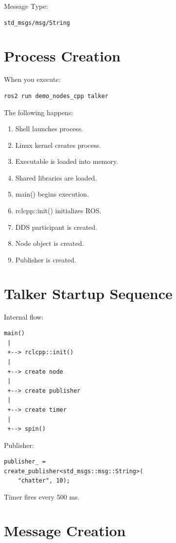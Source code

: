 \documentclass[11pt]{article}
\begin{document}
Message Type:

\begin{verbatim}
std_msgs/msg/String
\end{verbatim}

\section{Process Creation}

When you execute:

\begin{verbatim}
ros2 run demo_nodes_cpp talker
\end{verbatim}

The following happens:

\begin{enumerate}
\item Shell launches process.
\item Linux kernel creates process.
\item Executable is loaded into memory.
\item Shared libraries are loaded.
\item main() begins execution.
\item rclcpp::init() initializes ROS.
\item DDS participant is created.
\item Node object is created.
\item Publisher is created.
\end{enumerate}

\section{Talker Startup Sequence}

Internal flow:

\begin{verbatim}
main()
 |
 +--> rclcpp::init()
 |
 +--> create node
 |
 +--> create publisher
 |
 +--> create timer
 |
 +--> spin()
\end{verbatim}

Publisher:

\begin{verbatim}
publisher_ =
create_publisher<std_msgs::msg::String>(
    "chatter", 10);
\end{verbatim}

Timer fires every 500 ms.

\section{Message Creation}
\end{document}
